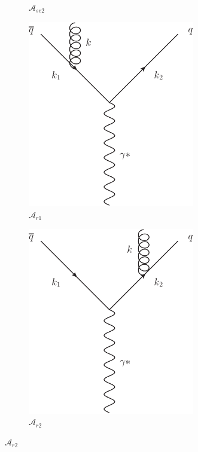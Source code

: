 \begin{figure}[tpb]
\begin{subfigure}[b]{0.48\textwidth}
				\caption{$\mathcal{A}_{se2}$}
				\label{fig:NLOfig_4}
			\end{subfigure}
			\begin{subfigure}[b]{0.48\textwidth}
				\includegraphics[width=0.8\textwidth]{NLORealLeft}
				\caption{$\mathcal{A}_{r1}$}
				\label{fig:NLOfig_5}
			\end{subfigure}
			\begin{subfigure}[b]{0.48\textwidth}
				\includegraphics[width=0.8\textwidth]{NLORealRight}
				\caption{$\mathcal{A}_{r2}$}
				\label{fig:NLOfig_6}
			\end{subfigure}


\end{figure}
